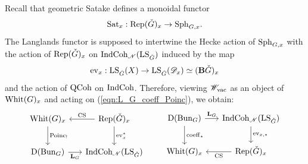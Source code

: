 \subsubsection{} Recall that geometric Satake defines a monoidal functor
    \[\mathrm{Sat}_x : \mathrm{Rep}({\check{G}})_x \to \mathrm{Sph}_{G,x}.\]
The Langlands functor is supposed to intertwine the Hecke action of $\mathrm{Sph}_{G,x}$ with the action of $\mathrm{Rep}({\check{G}})_x$ on $\mathrm{IndCoh}_{\mathscr{N}}(\mathrm{LS}_{\check{G}})$ induced by the map
    \[\mathrm{ev}_x : \mathrm{LS}_{\check{G}}(X) \to \mathrm{LS}_{\check{G}}(\mathscr{D}_x) \simeq (\mathbf{B} {\check{G}})_x\]
and the action of $\mathrm{QCoh}$ on $\mathrm{IndCoh}$. Therefore, viewing $\mathscr{W}_{\mathrm{vac}}$ as an object of $\mathrm{Whit}(G)_x$ and acting on (\ref{eqn:L_G_coeff_Poinc}), we obtain:
\[
\begin{tikzcd}[
  column sep={8em,between origins},
  row sep={4em,between origins}
]
    \Whit(G)_x \arrow[d, "\Poinc_!"] & \Rep(\LG)_x \arrow[d, "\ev_x^*"] \arrow[l, "\CS" above] \\ 
    \DMod(\Bun_G) \arrow[r, "\GLL_G" below] & \ICoh_\Nilp(\LS_\LG)
\end{tikzcd}
\qquad
\begin{tikzcd}[
  column sep={8em,between origins},
  row sep={4em,between origins}
]
  \DMod(\Bun_G) \arrow[d, "\coeff_*"] \arrow[r, "\GLL_G"] & \ICoh_\Nilp(\LS_\LG) \arrow[d, "\ev_{x,*}"] \\
  \Whit(G)_x & \Rep(\LG)_x \arrow[l, "\CS"]
\end{tikzcd}
\]

